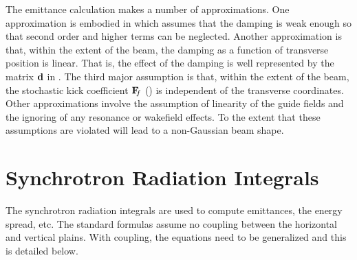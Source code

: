 The emittance calculation makes a number of approximations. One approximation is embodied in
 which assumes that the damping is weak enough so that second order and higher terms can be
neglected. Another approximation is that, within the extent of the beam, the damping as a function
of transverse position is linear. That is, the effect of the damping is well represented by the matrix
${\bf d}$ in . The third major assumption is that, within the extent of the beam, the
stochastic kick coefficient ${\bf F}_{\mkern-6 mu{f}}$ () is independent of the transverse coordinates.
Other approximations involve the assumption of linearity of the guide fields and the ignoring of
any resonance or wakefield effects. To the extent that these assumptions are violated will lead to
a non-Gaussian beam shape. 

\section{Synchrotron Radiation Integrals}
\label{s:synch.ints}

The synchrotron radiation integrals are used to compute emittances, the energy spread, etc. The
standard formulas assume no coupling between the horizontal and vertical
plains\cite{b:helm,b:jowett}. With coupling, the equations need to be generalized and this is
detailed below.

